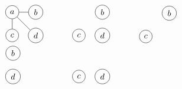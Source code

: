 \documentclass[12pt, A4]{article}
\begin{document}
\begin{enumerate}
\[\begin{tabular}{*{4}{p{0.2\textwidth}}}
							\begin{tikzpicture}
								\node[circle, draw] (a) at (0, 1) {\(a\)};
								\node[circle, draw] (b) at (1, 1) {\(b\)};
								\node[circle, draw] (c) at (0, 0) {\(c\)};
								\node[circle, draw] (d) at (1, 0) {\(d\)};
								\draw (a) to (b);
								\draw (a) to (c);
								\draw (a) to (d);
							\end{tikzpicture}
						&
							\begin{tikzpicture}
								\node[circle, draw] (b) at (1, 1) {\(b\)};
								\node[circle, draw] (c) at (0, 0) {\(c\)};
								\node[circle, draw] (d) at (1, 0) {\(d\)};
							\end{tikzpicture}
						&
							\begin{tikzpicture}
								\node[circle, draw] (b) at (1, 1) {\(b\)};
								\node[circle, draw] (c) at (0, 0) {\(c\)};
							\end{tikzpicture}
						\\
							\begin{tikzpicture}
								\node[circle, draw] (b) at (1, 1) {\(b\)};
								\node[circle, draw] (d) at (1, 0) {\(d\)};
							\end{tikzpicture}
						&
							\begin{tikzpicture}
								\node[circle, draw] (c) at (0, 0) {\(c\)};
								\node[circle, draw] (d) at (1, 0) {\(d\)};
							\end{tikzpicture}
					\end{tabular}\]
			\end{enumerate}
\end{document}
